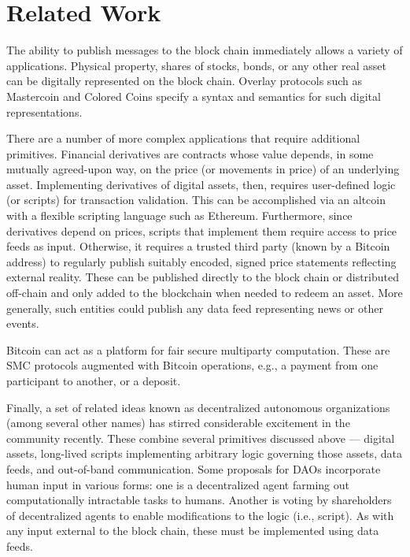 \section{Related Work}
\label{sec:related}

The ability to publish messages to the block chain immediately allows a variety of applications. Physical property, shares of stocks, bonds, or any other real asset can be digitally represented on the block chain. Overlay protocols such as Mastercoin and Colored Coins specify a syntax and semantics for such digital representations\cite{mastercoinspec, rosenfeld2012overview}.

There are a number of more complex applications that require additional primitives. Financial derivatives are contracts whose value depends, in some mutually agreed-upon way, on the price (or movements in price) of an underlying asset. Implementing derivatives of digital assets, then, requires user-defined logic (or scripts) for transaction validation. This can be accomplished via an altcoin with a flexible scripting language such as Ethereum. Furthermore, since derivatives depend on prices, scripts that implement them require access to price feeds as input. Otherwise, it requires a trusted third party (known by a Bitcoin address) to regularly publish suitably encoded, signed price statements reflecting external reality. These can be published directly to the block chain or distributed off-chain and only added to the blockchain when needed to redeem an asset. More generally, such entities could publish any data feed representing news or other events.

Bitcoin can act as a platform for fair secure multiparty computation. These are SMC protocols augmented with Bitcoin operations, e.g., a payment from one participant to another, or a deposit.

Finally, a set of related ideas known as decentralized autonomous organizations (among several other names) has stirred considerable excitement in the community recently. These combine several primitives discussed above --- digital assets, long-lived scripts implementing arbitrary logic governing those assets, data feeds, and out-of-band communication. Some proposals for DAOs incorporate human input in various forms: one is a decentralized agent farming out computationally intractable tasks to humans. Another is voting by shareholders of decentralized agents to enable modifications to the logic (i.e., script). As with any input external to the block chain, these must be implemented using data feeds.

